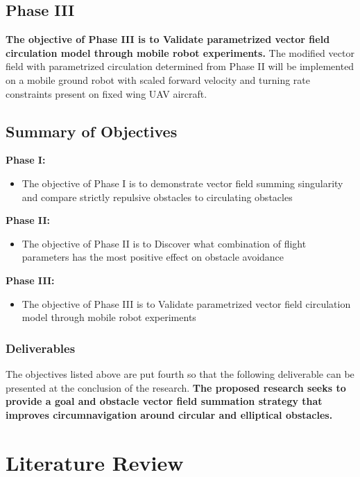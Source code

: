 \documentclass[numbered,pdftex]{ohio-etd}
\begin{document}
\section{Phase III}
\textbf{The objective of Phase III is to Validate parametrized vector field circulation model through mobile robot experiments.} The modified vector field with parametrized circulation determined from Phase II will be implemented on a mobile ground robot with scaled forward velocity and turning rate constraints present on fixed wing UAV aircraft.


\section{Summary of Objectives}
\textbf{Phase I:}
\begin{itemize}
\item The objective of Phase I is to demonstrate vector field summing singularity and compare strictly repulsive obstacles to circulating obstacles
\end{itemize}

\textbf{Phase II:}
\begin{itemize}
	\item The objective of Phase II is to Discover what combination of flight parameters has the most positive effect on obstacle avoidance
\end{itemize}

\textbf{Phase III:}
\begin{itemize}
\item The objective of Phase III is to Validate parametrized vector field circulation model through mobile robot experiments
\end{itemize}




\subsection{Deliverables}
The objectives listed above are put fourth so that the following deliverable can be presented at the conclusion of the research. \textbf{The proposed research seeks to provide a goal and obstacle vector field summation strategy that improves circumnavigation around circular and elliptical obstacles.}



\chapter{Literature Review}
\end{document}
